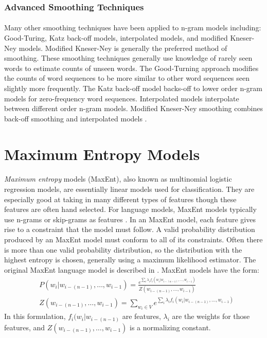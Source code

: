\subsubsection{Advanced Smoothing Techniques}
\paragraph{}
Many other smoothing techniques have been applied to n-gram models including: Good-Turing, Katz back-off models, interpolated models, and modified Kneser-Ney models. Modified Kneser-Ney is generally the preferred method of smoothing. These smoothing techniques generally use knowledge of rarely seen words to estimate counts of unseen words. The Good-Turning approach modifies the counts of word sequences to be more similar to other word sequences seen slightly more frequently. The Katz back-off model backs-off to lower order n-gram models for zero-frequency word sequences. Interpolated models interpolate between different order n-gram models. Modified Kneser-Ney smoothing combines back-off smoothing and interpolated models \cite{Jurafsky2009}.

\section{Maximum Entropy  Models}
\paragraph{}
\emph{Maximum entropy} models (MaxEnt), also known as multinomial logistic regression models, are essentially linear models used for classification. They are especially good at taking in many different types of features though these features are often hand selected. For language models, MaxEnt models typically use n-grams or skip-grams as features \cite{Mikolov2012}. In an MaxEnt model, each feature gives rise to a constraint that the model must follow. A valid probability distribution produced by an MaxEnt model must conform to all of its constraints. Often there is more than one valid probability distribution, so the distribution with the highest entropy is chosen, generally using a maximum likelihood estimator. The original MaxEnt language model is described in \cite{Rosenfeld1994}.
MaxEnt models have the form:
\begin{align}
&P(w_i | w_{i-(n-1)},\dots, w_{i-1}) = \frac{e^{\sum_i \lambda_i f_i(w_i | w_{i-(n-1)},\dots, w_{i-1})}}{Z(w_{i-(n-1)},
\dots, w_{i-1})} \label{eq:maxent}
\\
&Z(w_{i-(n-1)},\dots, w_{i-1}) = \sum_{w_i \in V} e^{\sum_i \lambda_i f_i(w_i | w_{i-(n-1)},\dots, w_{i-1})} \nonumber
\end{align}
In this formulation, $f_i(w_i | w_{i-(n-1)}$ are features, $\lambda_i$ are the weights for those features, and $Z(w_{i-(n-1)},\dots, w_{i-1})$ is a normalizing constant.
